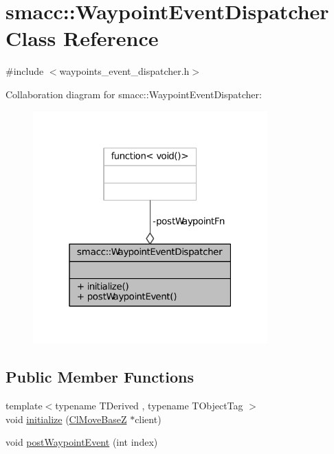 \hypertarget{classsmacc_1_1WaypointEventDispatcher}{}\section{smacc\+:\+:Waypoint\+Event\+Dispatcher Class Reference}
\label{classsmacc_1_1WaypointEventDispatcher}


{\ttfamily \#include $<$waypoints\+\_\+event\+\_\+dispatcher.\+h$>$}



Collaboration diagram for smacc\+:\+:Waypoint\+Event\+Dispatcher\+:
\nopagebreak
\begin{figure}[H]
\begin{center}
\leavevmode
\includegraphics[width=256pt]{classsmacc_1_1WaypointEventDispatcher__coll__graph}
\end{center}
\end{figure}
\subsection*{Public Member Functions}
\begin{DoxyCompactItemize}
\item 
{\footnotesize template$<$typename T\+Derived , typename T\+Object\+Tag $>$ }\\void \hyperlink{classsmacc_1_1WaypointEventDispatcher_ad68384f96ef92ade4942320f898cdd3b}{initialize} (\hyperlink{classsmacc_1_1ClMoveBaseZ}{Cl\+Move\+BaseZ} $\ast$client)
\item 
void \hyperlink{classsmacc_1_1WaypointEventDispatcher_a6bd85034cb55795930741301a6077fe5}{post\+Waypoint\+Event} (int index)
\end{DoxyCompactItemize}
